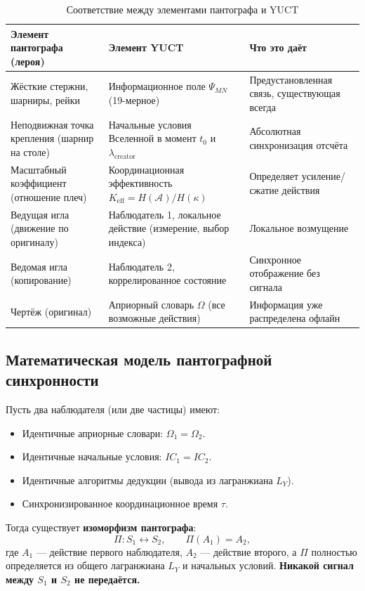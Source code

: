 \documentclass[12pt,a4paper]{article}
\begin{document}
	\begin{table}[htbp]
		\centering
		\caption{Соответствие между элементами пантографа и YUCT}
		\label{tab:pantograf}
		\begin{tabular}{|p{3.5cm}|p{3.5cm}|p{5.5cm}|}
			\hline
			\textbf{Элемент пантографа (лероя)} & \textbf{Элемент YUCT} & \textbf{Что это даёт} \\
			\hline
			Жёсткие стержни, шарниры, рейки & Информационное поле \(\Psi_{MN}\) (19-мерное) & Предустановленная связь, существующая всегда \\
			\hline
			Неподвижная точка крепления (шарнир на столе) & Начальные условия Вселенной в момент \(t_0\) и \(\lambda_{\mathrm{creator}}\) & Абсолютная синхронизация отсчёта \\
			\hline
			Масштабный коэффициент (отношение плеч) & Координационная эффективность \(K_{\mathrm{eff}} = H(\mathcal{A})/H(\kappa)\) & Определяет усиление/сжатие действия \\
			\hline
			Ведущая игла (движение по оригиналу) & Наблюдатель 1, локальное действие (измерение, выбор индекса) & Локальное возмущение \\
			\hline
			Ведомая игла (копирование) & Наблюдатель 2, коррелированное состояние & Синхронное отображение без сигнала \\
			\hline
			Чертёж (оригинал) & Априорный словарь \(\Omega\) (все возможные действия) & Информация уже распределена офлайн \\
			\hline
		\end{tabular}
	\end{table}
	
	\subsection{Математическая модель пантографной синхронности}
	
	Пусть два наблюдателя (или две частицы) имеют:
	\begin{itemize}
		\item Идентичные априорные словари: \(\Omega_1 = \Omega_2\).
		\item Идентичные начальные условия: \(IC_1 = IC_2\).
		\item Идентичные алгоритмы дедукции (вывода из лагранжиана \(L_Y\)).
		\item Синхронизированное координационное время \(\tau\).
	\end{itemize}
	
	Тогда существует \textbf{изоморфизм пантографа}:
	\[
	\Pi: S_1 \leftrightarrow S_2, \qquad \Pi(A_1) = A_2,
	\]
	где \(A_1\) — действие первого наблюдателя, \(A_2\) — действие второго, а \(\Pi\) полностью определяется из общего лагранжиана \(L_Y\) и начальных условий. \textbf{Никакой сигнал между \(S_1\) и \(S_2\) не передаётся.}
	
\end{document}
